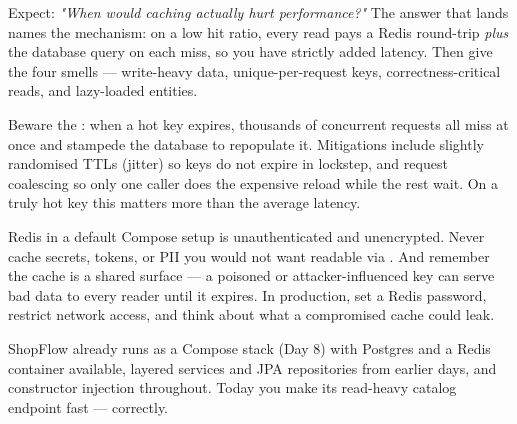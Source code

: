 \begin{interview}
Expect: \emph{"When would caching actually hurt performance?"} The answer that lands names the mechanism: on a low hit ratio, every read pays a Redis round-trip \emph{plus} the database query on each miss, so you have strictly added latency. Then give the four smells --- write-heavy data, unique-per-request keys, correctness-critical reads, and lazy-loaded entities.
\end{interview}

\begin{perfnote}
Beware the : when a hot key expires, thousands of concurrent requests all miss at once and stampede the database to repopulate it. Mitigations include slightly randomised TTLs (jitter) so keys do not expire in lockstep, and request coalescing so only one caller does the expensive reload while the rest wait. On a truly hot key this matters more than the average latency.
\end{perfnote}

\begin{secwarn}
Redis in a default Compose setup is unauthenticated and unencrypted. Never cache secrets, tokens, or PII you would not want readable via . And remember the cache is a shared surface --- a poisoned or attacker-influenced key can serve bad data to every reader until it expires. In production, set a Redis password, restrict network access, and think about what a compromised cache could leak.
\end{secwarn}


ShopFlow already runs as a Compose stack (Day 8) with Postgres and a Redis container available, layered services and JPA repositories from earlier days, and constructor injection throughout. Today you make its read-heavy catalog endpoint fast --- correctly.


